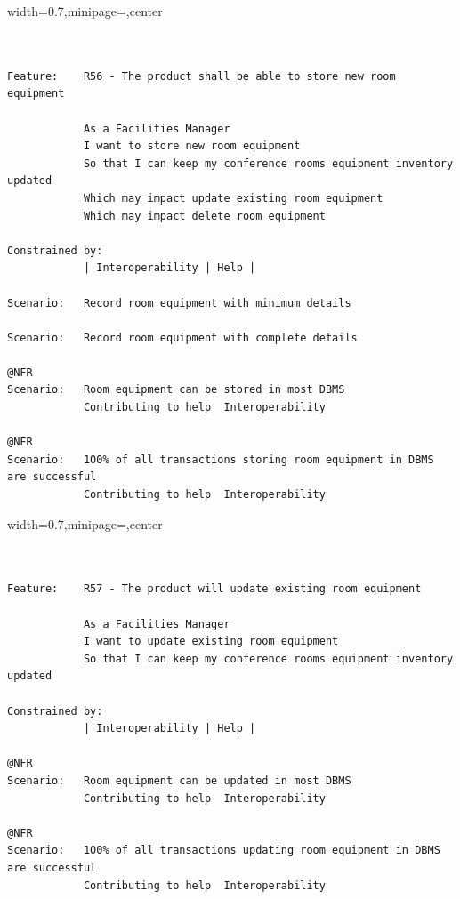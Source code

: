 \documentclass[dissertation,final]{softeng}
\newenvironment{featurecode}[1]
{ \lrbox\featurebox \begin{adjustbox}{width=#1\textwidth,minipage=\textwidth,center} }
{ \end{adjustbox}\endlrbox}
\newenvironment{featurelist}[2]
{
\newcommand{\setcaption}{\caption{#1}}
\newcommand{\setlabel}{\label{#2}}
}
{\begin{listing}[h!]\centering\usebox\featurebox\setcaption\setlabel\end{listing}}
\begin{document}
\begin{appendices}
\begin{featurelist}{R56 -- The product shall be able to store new room equipment}{lst:feature_r56}
\begin{featurecode}{0.7}
\begin{verbatim}


Feature:    R56 - The product shall be able to store new room equipment

            As a Facilities Manager
            I want to store new room equipment
            So that I can keep my conference rooms equipment inventory updated
            Which may impact update existing room equipment
            Which may impact delete room equipment
			
Constrained by:
            | Interoperability | Help |

Scenario:   Record room equipment with minimum details

Scenario:   Record room equipment with complete details

@NFR
Scenario:   Room equipment can be stored in most DBMS
            Contributing to help  Interoperability

@NFR
Scenario:   100% of all transactions storing room equipment in DBMS are successful
            Contributing to help  Interoperability
\end{verbatim}
\end{featurecode}
\end{featurelist}
\clearpage

\begin{featurelist}{R57 -- The product will update existing room equipment}{lst:feature_r57}
\begin{featurecode}{0.7}
\begin{verbatim}


Feature:    R57 - The product will update existing room equipment

            As a Facilities Manager
            I want to update existing room equipment
            So that I can keep my conference rooms equipment inventory updated
			
Constrained by:
            | Interoperability | Help |

@NFR
Scenario:   Room equipment can be updated in most DBMS
            Contributing to help  Interoperability

@NFR
Scenario:   100% of all transactions updating room equipment in DBMS are successful
            Contributing to help  Interoperability
\end{verbatim}
\end{featurecode}
\end{featurelist}


\end{appendices}
\end{document}
